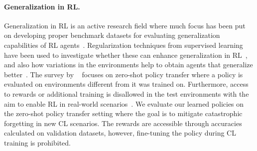 \paragraph{Generalization in RL.} 
Generalization in RL is an active research field where much focus has been put on developing proper benchmark datasets for evaluating generalization capabilities of RL agents~. 
Regularization techniques from supervised learning have been used to investigate whether these can enhance generalization in RL~, and also how variations in the environments help to obtain agents that generalize better~. The survey by ~ focuses on zero-shot policy transfer where a policy is evaluated on environments different from it was trained on. Furthermore, access to rewards or additional training is disallowed in the test environments with the aim to enable RL in real-world scenarios~. We evaluate our learned policies on the zero-shot policy transfer setting where the goal is to mitigate catastrophic forgetting in new CL scenarios. The rewards are accessible through accuracies calculated on validation datasets, however, fine-tuning the policy during CL training is prohibited.  







